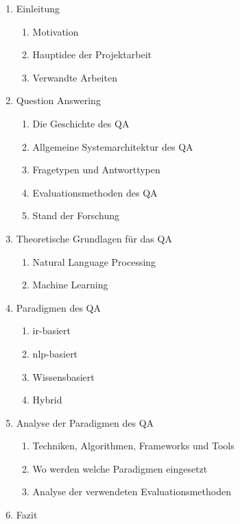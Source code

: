 \documentclass[
        ngerman,
        paper=a4,
        numbers=noendperiod,
]{scrreprt}
\begin{document}
\renewcommand{\labelenumii}{\theenumii}
\renewcommand{\theenumii}{\theenumi.\arabic{enumii}.}

\begin{enumerate}

\item Einleitung
    \begin{enumerate}
    \item Motivation
    \item Hauptidee der Projektarbeit
    \item Verwandte Arbeiten
  \end{enumerate}
  
  
\item Question Answering
    \begin{enumerate}
    \item Die Geschichte des QA
    \item Allgemeine Systemarchitektur des QA
    \item Fragetypen und Antworttypen
    \item Evaluationsmethoden des QA
    \item Stand der Forschung
  \end{enumerate}
  
\item Theoretische Grundlagen für das QA
    \begin{enumerate}
    \item Natural Language Processing
    \item Machine Learning
  \end{enumerate}
  
\item Paradigmen des QA
    \begin{enumerate}
    \item \ac{ir}-basiert
    \item \ac{nlp}-basiert
    \item Wissensbasiert
    \item Hybrid
  \end{enumerate}

\item Analyse der Paradigmen des QA
    \begin{enumerate}
    \item Techniken, Algorithmen, Frameworks und Tools 
    \item Wo werden welche Paradigmen eingesetzt
    \item Analyse der verwendeten Evaluationsmethoden 
  \end{enumerate}
  
\item Fazit
  
  
  
\end{enumerate}
\end{document}
